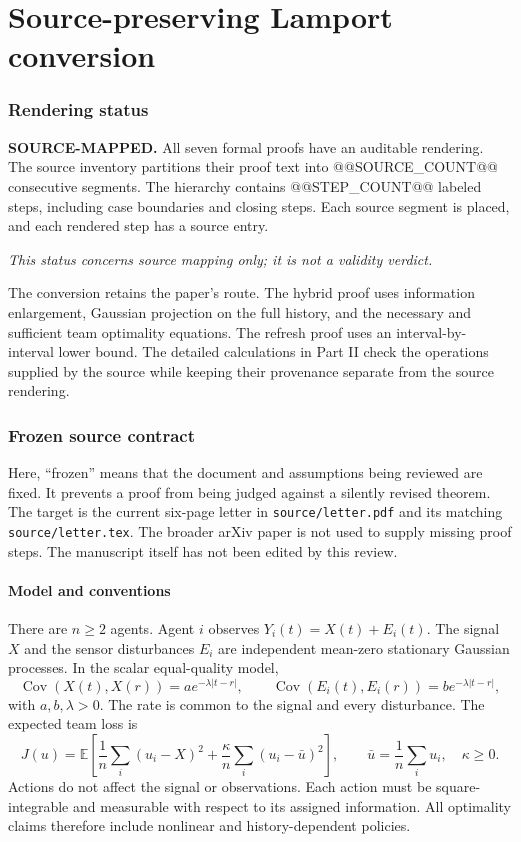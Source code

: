 \documentclass[11pt,letterpaper]{article}
\newcommand{\E}{\mathbb E}
\newcommand{\Cov}{\operatorname{Cov}}
\begin{document}
\part{Source-preserving Lamport conversion}
\section{Rendering status}
\textbf{SOURCE-MAPPED.} All seven formal proofs have an auditable rendering. The source inventory partitions their proof text into @@SOURCE_COUNT@@ consecutive segments. The hierarchy contains @@STEP_COUNT@@ labeled steps, including case boundaries and closing steps. Each source segment is placed, and each rendered step has a source entry.

\emph{This status concerns source mapping only; it is not a validity verdict.}

The conversion retains the paper's route. The hybrid proof uses information enlargement, Gaussian projection on the full history, and the necessary and sufficient team optimality equations. The refresh proof uses an interval-by-interval lower bound. The detailed calculations in Part II check the operations supplied by the source while keeping their provenance separate from the source rendering.

\section{Frozen source contract}
Here, ``frozen'' means that the document and assumptions being reviewed are fixed. It prevents a proof from being judged against a silently revised theorem. The target is the current six-page letter in \texttt{source/letter.pdf} and its matching \texttt{source/letter.tex}. The broader arXiv paper is not used to supply missing proof steps. The manuscript itself has not been edited by this review.

\subsection{Model and conventions}
There are $n\ge2$ agents. Agent $i$ observes $Y_i(t)=X(t)+E_i(t)$. The signal $X$ and the sensor disturbances $E_i$ are independent mean-zero stationary Gaussian processes. In the scalar equal-quality model,
\[
\Cov(X(t),X(r))=a e^{-\lambda|t-r|},\qquad
\Cov(E_i(t),E_i(r))=b e^{-\lambda|t-r|},
\]
with $a,b,\lambda>0$. The rate is common to the signal and every disturbance. The expected team loss is
\begin{equation}
J(u)=\E\left[\frac1n\sum_i(u_i-X)^2+
\frac\kappa n\sum_i(u_i-\bar u)^2\right],\qquad
\bar u=\frac1n\sum_i u_i,\quad\kappa\ge0.
\tag{A1}
\end{equation}
Actions do not affect the signal or observations. Each action must be square-integrable and measurable with respect to its assigned information. All optimality claims therefore include nonlinear and history-dependent policies.
\end{document}
